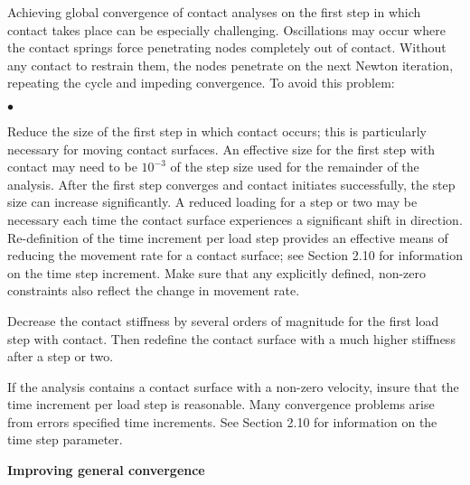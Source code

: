 \documentclass[11pt]{report}
\numberwithin{equation}{section}
\newcommand{\noi}{\noindent}
\newcommand{\squishlist}{
 \begin{list}{$\bullet$}
  { \setlength{\itemsep}{0pt}
     \setlength{\parsep}{3pt}
     \setlength{\topsep}{3pt}
     \setlength{\partopsep}{0pt}
     \setlength{\leftmargin}{1.5em}
     \setlength{\labelwidth}{1em}
     \setlength{\labelsep}{0.5em} } }
\newcommand{\squishend}{
  \end{list}  }
\begin{document}
\noi Achieving global convergence of contact analyses on the 
first step in which contact takes place can be especially challenging. 
Oscillations may occur where the contact springs force penetrating 
nodes completely out of contact. Without any contact to restrain them, 
the nodes penetrate on the next Newton iteration, repeating the cycle 
and impeding convergence. To avoid this problem:
\small
\squishlist
\item Reduce the size of the first step in which contact 
occurs; this is particularly necessary for moving contact surfaces. 
An effective size for the first step with contact may need to 
be $10^{-3}$ of the step size used for the remainder of 
the analysis. After the first step converges and contact 
initiates successfully, the step size can increase significantly. 
A reduced loading for a step or two may be necessary 
each time the contact surface experiences a significant 
shift in direction. Re-definition of the time increment per 
load step provides an effective means of reducing the 
movement rate for a contact surface; see Section 2.10 
for information on the time step increment. Make sure 
that any explicitly defined, non-zero constraints also reflect 
the change in movement rate.
\item Decrease the contact stiffness by several 
orders of magnitude for the first load step with contact. Then 
redefine the contact surface with a much higher stiffness after a step or two. 
\item If the analysis contains a contact surface with a non-zero 
velocity, insure that the time increment per load step is reasonable. 
Many convergence problems arise from errors specified 
time increments. See Section 2.10 for information on the time step parameter.
\squishend
\normalsize

\noindent \bf{Improving general convergence}\rm
\end{document}
